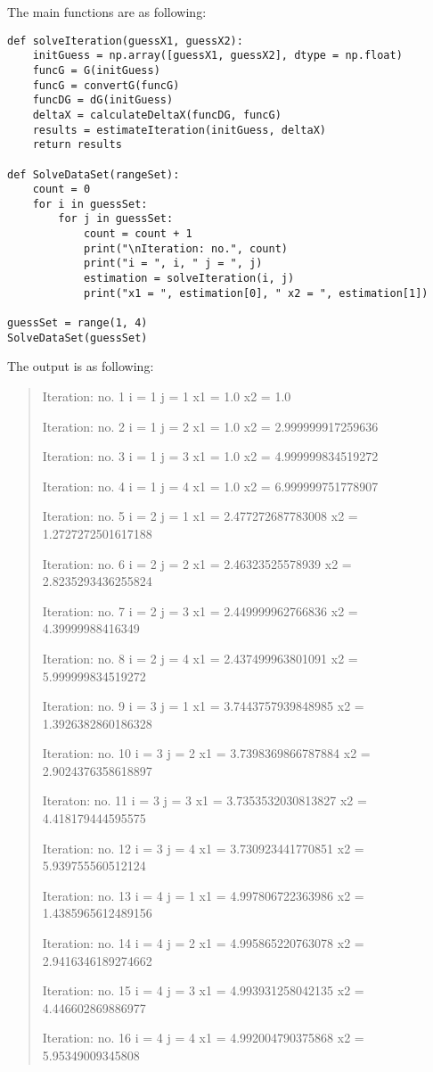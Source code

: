 The main functions are as following: 
\begin{lstlisting}
def solveIteration(guessX1, guessX2):
    initGuess = np.array([guessX1, guessX2], dtype = np.float)
    funcG = G(initGuess)
    funcG = convertG(funcG)
    funcDG = dG(initGuess)
    deltaX = calculateDeltaX(funcDG, funcG)
    results = estimateIteration(initGuess, deltaX)
    return results

def SolveDataSet(rangeSet):
    count = 0
    for i in guessSet:
        for j in guessSet:
            count = count + 1
            print("\nIteration: no.", count)
            print("i = ", i, " j = ", j)
            estimation = solveIteration(i, j)
            print("x1 = ", estimation[0], " x2 = ", estimation[1])

guessSet = range(1, 4)
SolveDataSet(guessSet)
\end{lstlisting}
The output is as following:
\begin{quote}
    Iteration: no. 1
i =  1  j =  1
x1 =  1.0  x2 =  1.0

Iteration: no. 2
i =  1  j =  2
x1 =  1.0  x2 =  2.999999917259636

Iteration: no. 3
i =  1  j =  3
x1 =  1.0  x2 =  4.999999834519272

Iteration: no. 4
i =  1  j =  4
x1 =  1.0  x2 =  6.999999751778907

Iteration: no. 5
i =  2  j =  1
x1 =  2.477272687783008  x2 =  1.2727272501617188

Iteration: no. 6
i =  2  j =  2
x1 =  2.46323525578939  x2 =  2.8235293436255824

Iteration: no. 7
i =  2  j =  3
x1 =  2.449999962766836  x2 =  4.39999988416349

Iteration: no. 8
i =  2  j =  4
x1 =  2.437499963801091  x2 =  5.999999834519272

Iteration: no. 9
i =  3  j =  1
x1 =  3.7443757939848985  x2 =  1.3926382860186328

Iteration: no. 10
i =  3  j =  2
x1 =  3.7398369866787884  x2 =  2.9024376358618897

Iteraton: no. 11
i =  3  j =  3
x1 =  3.7353532030813827  x2 =  4.418179444595575

Iteration: no. 12
i =  3  j =  4
x1 =  3.730923441770851  x2 =  5.939755560512124

Iteration: no. 13
i =  4  j =  1
x1 =  4.997806722363986  x2 =  1.4385965612489156

Iteration: no. 14
i =  4  j =  2
x1 =  4.995865220763078  x2 =  2.9416346189274662

Iteration: no. 15
i =  4  j =  3
x1 =  4.993931258042135  x2 =  4.446602869886977

Iteration: no. 16
i =  4  j =  4
x1 =  4.992004790375868  x2 =  5.95349009345808
\end{quote}

\newpage

